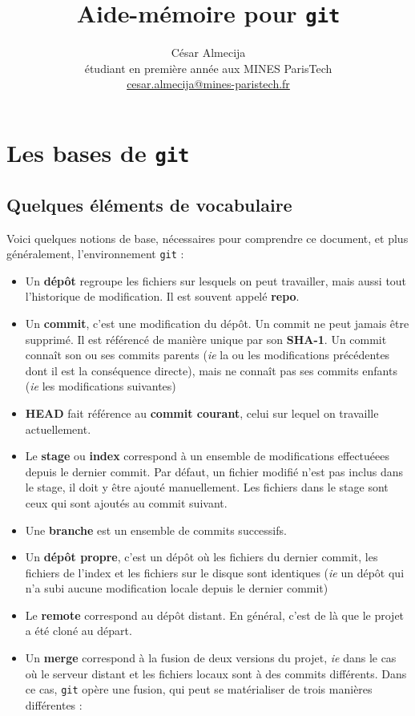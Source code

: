 \documentclass[french]{report}
\newcommand\itemb{\item[$\bullet$]}
\begin{document}
\title{Aide-mémoire pour \texttt{git}}
\author{César Almecija
\\ étudiant en première année aux MINES ParisTech
\\ \href{mailto:cesar.almecija@mines-paristech.fr}{cesar.almecija@mines-paristech.fr}}

\maketitle

\chapter{Les bases de \texttt{git}}

\section{Quelques éléments de vocabulaire}

Voici quelques notions de base, nécessaires pour comprendre ce document, et plus généralement, l'environnement \texttt{git} :
\begin{itemize}
    \itemb Un \textbf{dépôt} regroupe les fichiers sur lesquels on peut travailler, mais aussi tout l'historique de modification. Il est souvent appelé \textbf{repo}.
    \itemb Un \textbf{commit}, c'est une modification du dépôt.
    Un commit ne peut jamais être supprimé.
    Il est référencé de manière unique par son \textbf{SHA-1}.
    Un commit connaît son ou ses commits parents (\textit{ie} la ou les modifications précédentes dont il est la conséquence directe), mais ne connaît pas ses commits enfants (\textit{ie} les modifications suivantes)
    \itemb \textbf{HEAD} fait référence au \textbf{commit courant}, celui sur lequel on travaille actuellement.
    \itemb Le \textbf{stage} ou \textbf{index} correspond à un ensemble de modifications effectuéees depuis le dernier commit.
    Par défaut, un fichier modifié n'est pas inclus dans le stage, il doit y être ajouté manuellement.
    Les fichiers dans le stage sont ceux qui sont ajoutés au commit suivant.
    \itemb Une \textbf{branche} est un ensemble de commits successifs.
    \itemb Un \textbf{dépôt propre}, c'est un dépôt où les fichiers du dernier commit, les fichiers de l'index et les fichiers sur le disque sont identiques (\textit{ie} un dépôt qui n'a subi aucune modification locale depuis le dernier commit)
    \itemb Le \textbf{remote} correspond au dépôt distant. En général, c'est de là que le projet a été cloné au départ.
    \itemb Un \textbf{merge} correspond à la fusion de deux versions du projet, \textit{ie} dans le cas où le serveur distant et les fichiers locaux sont à des commits différents.
    Dans ce cas, \texttt{git} opère une fusion, qui peut se matérialiser de trois manières différentes :
\end{itemize}
\end{document}
